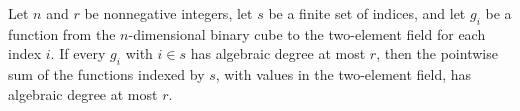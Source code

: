 \begin{theorem}
\label{FABL.functionAlgebraicDegree_finset_sum_le}
\leanok
{}
Let $n$ and $r$ be nonnegative integers, let $s$ be a finite set of indices, and let
$g_i$ be a function from the $n$-dimensional binary cube to the two-element field for
each index $i$. If every $g_i$ with $i\in s$ has algebraic degree at most $r$, then the
pointwise sum of the functions indexed by $s$, with values in the two-element field, has
algebraic degree at most $r$.
\end{theorem}
